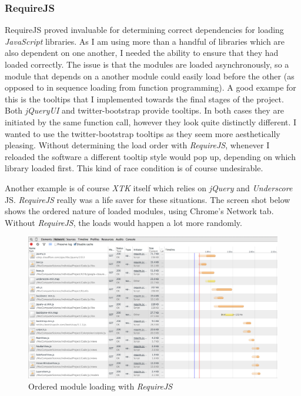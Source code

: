 \documentclass[a4paper,11pt,twoside]{article}
\begin{document}
\subsubsection{RequireJS}

RequireJS proved invaluable for determining correct dependencies for loading \textit{JavaScript} libraries. As I am using more than a handful of libraries which are also dependent on one another, I needed the ability to ensure that they had loaded correctly. The issue is that the modules are loaded asynchronously, so a module that depends on a another module could easily load before the other (as opposed to in sequence loading from function programming). A good exampe for this is the tooltips that I implemented towards the final stages of the project. Both \textit{jQueryUI} and twitter-bootstrap provide tooltips. In both cases they are initiated by the same function call, however they look quite distinctly different. I wanted to use the twitter-bootstrap tooltips as they seem more aesthetically pleasing. Without determining the load order with \textit{RequireJS}, whenever I reloaded the software a different tooltip style would pop up, depending on which library loaded first. This kind of race condition is of course undesirable.

Another example is of course \textit{XTK} itself which relies on \textit{jQuery} and \textit{Underscore} JS. \textit{RequireJS} really was a life saver for these situations. The screen shot below shows the ordered nature of loaded modules, using Chrome's Network tab. Without \textit{RequireJS}, the loads would happen a lot more randomly.


\begin{figure}[ht!]
\centering
\includegraphics[width=120mm]{graphics/requireOrder_01.png}
\caption{Ordered module loading with \textit{RequireJS}}
\label{fig:UIdesign1}
\end{figure}
\end{document}
